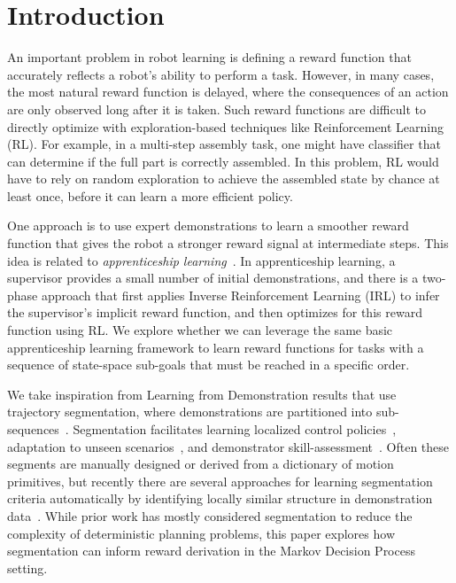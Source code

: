 \section{Introduction}
An important problem in robot learning is defining a reward function that accurately reflects a robot's ability to perform a task.
However, in many cases, the most natural reward function is delayed, where the consequences of an action are only observed long after it is taken.
Such reward functions are difficult to directly optimize with exploration-based techniques like Reinforcement Learning (RL).
For example, in a multi-step assembly task, one might have classifier that can determine if the full part is correctly assembled.
In this problem, RL would have to rely on random exploration to achieve the assembled state by chance at least once, before it can learn a more efficient policy.

One approach is to use expert demonstrations to learn a smoother reward function that gives the robot a stronger reward signal at intermediate steps.
This idea is related to \emph{apprenticeship learning}~\citep{DBLP:conf/nips/KolterAN07, coates2008learning, abbeel2004apprenticeship}.
In apprenticeship learning, a supervisor provides a small number of initial demonstrations, and there is a two-phase approach that first applies Inverse Reinforcement Learning (IRL) to infer the supervisor's implicit reward function, and then optimizes for this reward function using RL.
We explore whether we can leverage the same basic apprenticeship learning framework to learn reward functions for tasks with a sequence of state-space sub-goals that must be reached in a specific order.

We take inspiration from Learning from Demonstration results that use trajectory segmentation, where demonstrations are partitioned into sub-sequences~\citep{argall2009survey}.
Segmentation facilitates learning localized control policies~\citep{murali2015learning, niekum2012learning, konidaris2011robot}, adaptation to unseen scenarios~\citep{ijspreet2002learning, ude2010task}, and demonstrator skill-assessment~\citep{reiley2010motion, gao2014jigsaws}.
Often these segments are manually designed or derived from a dictionary of motion primitives, but recently there are several approaches for learning segmentation criteria automatically by identifying locally similar structure in demonstration data~\citep{barbivc2004segmenting, chiappa2010movement,  alvarez2010switched,calinon2010learning, kruger2012imitation, niekum2012learning, wachter2015hierarchical, lee2015autonomous}.
While prior work has mostly considered segmentation to reduce the complexity of deterministic planning problems, this paper explores how segmentation can inform reward derivation in the Markov Decision Process setting.

